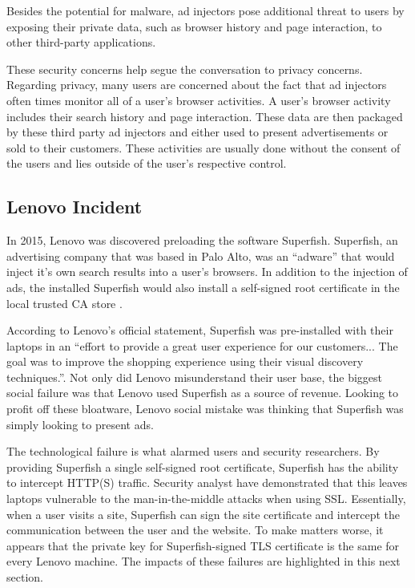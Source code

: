 \documentclass[journal]{IEEEtran}
\begin{document}
Besides the potential for malware, ad injectors pose additional threat to users by exposing their private data, such as browser history and page interaction, to other third-party applications.

These security concerns help segue the conversation to privacy concerns. Regarding privacy, many users are concerned about the fact that ad injectors often times monitor all of a user's browser activities. A user's browser activity includes their search history and page interaction. These data are then packaged by these third party ad injectors and either used to present advertisements or sold to their customers. These activities are usually done without the consent of the users and lies outside of the user's respective control.

\subsection{Lenovo Incident}
In 2015, Lenovo was discovered preloading the software Superfish. Superfish, an advertising company that was based in Palo Alto, was an ``adware'' that would inject it's own search results into a user's browsers. In addition to the injection of ads, the installed Superfish would also install a self-signed root certificate in the local trusted CA store \cite{lenovo_superfish}. 

According to Lenovo's official statement, Superfish was pre-installed with their laptops in an ``effort to provide a great user experience for our customers... The goal was to improve the shopping experience using their visual discovery techniques.''\cite{lenovo_statement}. Not only did Lenovo misunderstand their user base, the biggest social failure was that Lenovo used Superfish as a source of revenue. Looking to profit off these bloatware, Lenovo social mistake was thinking that Superfish was simply looking to present ads.

The technological failure is what alarmed users and security researchers. By providing Superfish a single self-signed root certificate, Superfish has the ability to intercept HTTP(S) traffic. Security analyst have demonstrated that this leaves laptops vulnerable to the man-in-the-middle attacks when using SSL. Essentially, when a user visits a site, Superfish can sign the site certificate and intercept the communication between the user and the website\cite{arstechnica_lenovo}. To make matters worse, it appears that the private key for Superfish-signed TLS certificate is the same for every Lenovo machine. The impacts of these failures are highlighted in this next section.
\end{document}
